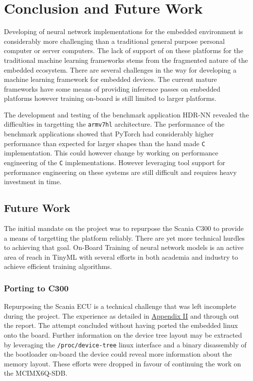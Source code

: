 \chapter{Conclusion and Future Work}

Developing of neural network implementations for the embedded environment is considerably more challenging than a traditional general purpose personal computer or server computers. The lack of support of on these platforms for the traditional machine learning frameworks stems from the fragmented nature of the embedded ecosystem. There are several challenges in the way for developing a machine learning framework for embedded devices. The current mature frameworks have some means of providing inference passes on embedded platforms however training on-board is still limited to larger platforms.

The development and testing of the benchmark application HDR-NN revealed the difficulties in targetting the \texttt{armv7hl} architecture. The performance of the benchmark applications showed that PyTorch had considerably higher performance than expected for larger shapes than the hand made \texttt{C} implementation. This could however change by working on performance engineering of the \texttt{C} implementations. However leveraging tool support for performance engineering on these systems are still difficult and requires heavy investment in time.

\section{Future Work}

The initial mandate on the project was to repurpose the Scania C300 to provide a means of targetting the platform reliably. There are yet more technical hurdles to achieving that goal. On-Board Training of neural network models is an active area of reach in TinyML with several efforts in both academia and industry to achieve efficient training algorithms.

\subsection{Porting to C300}

Repurposing the Scania ECU is a technical challenge that was left incomplete during the project. The experience as detailed in \hyperref[rtc-c300]{Appendix II} and through out the report. The attempt concluded without having ported the embedded linux onto the board. Further information on the device tree layout may be extracted by leveraging the \texttt{/proc/device-tree} linux interface and a binary disassembly of the bootloader on-board the device could reveal more information about the memory layout. These efforts were dropped in favour of continuing the work on the MCIMX6Q-SDB.

